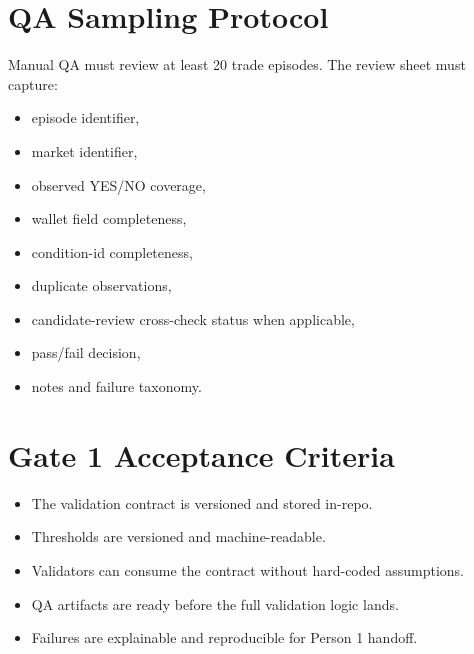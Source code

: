 \documentclass{article}
\begin{document}
\section*{QA Sampling Protocol}

Manual QA must review at least 20 trade episodes. The review sheet must capture:
\begin{itemize}
\item episode identifier,
\item market identifier,
\item observed YES/NO coverage,
\item wallet field completeness,
\item condition-id completeness,
\item duplicate observations,
\item candidate-review cross-check status when applicable,
\item pass/fail decision,
\item notes and failure taxonomy.
\end{itemize}

\section*{Gate 1 Acceptance Criteria}

\begin{itemize}
\item The validation contract is versioned and stored in-repo.
\item Thresholds are versioned and machine-readable.
\item Validators can consume the contract without hard-coded assumptions.
\item QA artifacts are ready before the full validation logic lands.
\item Failures are explainable and reproducible for Person 1 handoff.
\end{itemize}
\end{document}
